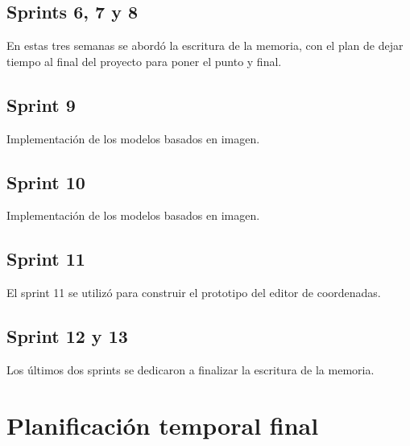 \subsection{Sprints 6, 7 y 8}

En estas tres semanas se abordó la escritura de la memoria, con el plan de dejar tiempo al final del proyecto para poner el punto y final.

\subsection{Sprint 9}

Implementación de los modelos basados en imagen.

\subsection{Sprint 10}

Implementación de los modelos basados en imagen.

\subsection{Sprint 11}

El sprint 11 se utilizó para construir el prototipo del editor de coordenadas.

\subsection{Sprint 12 y 13}

Los últimos dos sprints se dedicaron a finalizar la escritura de la memoria.


\section{Planificación temporal final}

